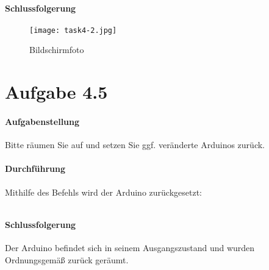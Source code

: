 \paragraph{Schlussfolgerung}


\begin{figure}
	\centering
	\texttt{[image: task4-2.jpg]}
	\caption{Bildschirmfoto}
	\label{task4-2}
\end{figure}





\section{Aufgabe 4.5}
\paragraph{Aufgabenstellung}
Bitte räumen Sie auf und setzen Sie ggf. veränderte Arduinos zurück.

\paragraph{Durchführung}
Mithilfe des Befehls wird der Arduino zurückgesetzt:

\inputminted[breaklines, fontsize=\fontsize{10pt}{10pt}]{bash}{../docs/reset-dmx.txt}

\paragraph{Schlussfolgerung}
Der Arduino befindet sich in seinem Ausgangszustand und wurden Ordnungsgemäß zurück geräumt.